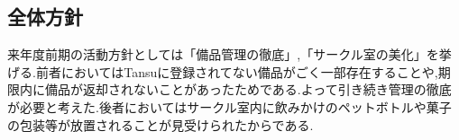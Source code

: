\subsection*{全体方針}


 来年度前期の活動方針としては「備品管理の徹底」,「サークル室の美化」を挙げる.前者においてはTansuに登録されてない備品がごく一部存在することや,期限内に備品が返却されないことがあったためである.よって引き続き管理の徹底が必要と考えた.後者においてはサークル室内に飲みかけのペットボトルや菓子の包装等が放置されることが見受けられたからである.

